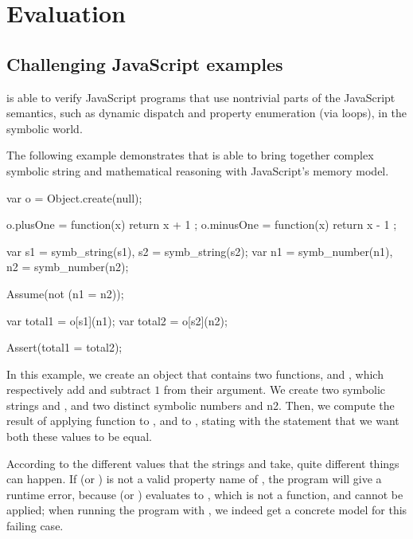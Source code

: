 
\section{Evaluation}

\subsection{Challenging JavaScript examples}

\cosette is able to verify JavaScript programs that use nontrivial parts of the JavaScript semantics, such as dynamic dispatch and property enumeration (via  loops), in the symbolic world.

The following example demonstrates that \cosette is able to bring together complex symbolic string and mathematical reasoning with JavaScript's memory model.

\begin{lstjs}
var o = Object.create(null);

o.plusOne = function(x) { return x + 1 };
o.minusOne = function(x) { return x - 1 };

var s1 = symb_string(s1), s2 = symb_string(s2);
var n1 = symb_number(n1), n2 = symb_number(n2);

Assume(not (n1 = n2));

var total1 = o[s1](n1);
var total2 = o[s2](n2);

Assert(total1 = total2);
\end{lstjs}

In this example, we create an object  that contains two functions,  and , which respectively add and subtract $1$ from their argument.
We create two symbolic strings  and , and two distinct symbolic numbers  and {n2}.
Then, we compute the result of applying function  to , and  to , stating with the  statement that we want both these values to be equal.

According to the different values that the strings  and  take, quite different things can happen.
If  (or ) is not a valid property name of , the program will give a runtime error, because  (or ) evaluates to , which is not a function, and cannot be applied; when running the program with \cosette, we indeed get a concrete model for this failing case.

